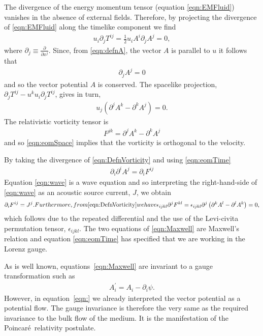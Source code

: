 \documentclass[10pt, fleqn,final,showtrims,oldfontcommands]{article} %
\newcommand{\sub}[1]{\begin{subequations}#1\end{subequations}}
\newcommand{\eqa}[1]{\begin{align}#1\end{align}}
\newcommand{\eqal}[2]{\begin{align}#1\label{eqn:#2}\end{align}}
\newcommand{\eqnref}[1]{\ref{eqn:#1}}
\newcommand{\lr}[1]{\left( #1 \right)}
\renewcommand{\d}{\partial}
\newcommand{\del}{\nabla}
\newcommand{\scope}[1]{\tilde{#1}}
\newcommand{\half}{\tfrac{1}{2}}
\newcommand{\Poincare}{Poincar{\'e}}
\begin{document}
The divergence of the energy momentum tensor (equation \eqnref{EMFluid}) vanishes in the absence of external fields.
Therefore, by projecting the divergence of \eqnref{EMFluid} along the timelike component we find
\eqa{
  u_i \d_j T^{i j} = \half u_i A^i \d_j A^j = 0,
}
where $\d_j \equiv \frac{\d}{\d x^j}$.
Since, from \eqnref{defnA}, the vector $A$ is parallel to $u$  it follows that 
\eqal{
  \d_j A^j = 0
}{eomTime}
and so the vector potential $A$ is conserved.
The spacelike projection,
$\d_j T^{i j} - u^k u_i \d_j T^{i j}$, gives in turn,
\eqal{
u_j \lr{\d^j A^k - \d^k A^j} = 0.
}{eomSpace}
The relativistic vorticity tensor is 
\eqal{
F^{j k} =\d^j A^k - \d^k A^j
}{DefnVorticity}
and so \eqnref{eomSpace} implies that the vorticity is orthogonal to the velocity.

By taking the divergence of \eqnref{DefnVorticity} and using \eqnref{eomTime} 
\eqal{
  \d_i \d^i A^j = \d_i F^{i j}
}{wave}
Equation \eqnref{wave} is a wave equation and so interpreting the right-hand-side of \eqnref{wave} as an acoustic source current, $J$, we obtain
\sub{
\label{eqn:Maxwell}
\eqa{
  \d_i F^{i j} = J^j.
}
Furthermore, from \eqnref{DefnVorticity} we have
\begin{align}
  \epsilon_{i j k l} \d^j F^{k l} = \epsilon_{i j k l} \d^j \lr{\d^k A^l - \d^l A^k} = 0,
\end{align}
}
which follows due to the repeated differential and the use of the Levi-civita permutation tensor, $\epsilon_{i j k l}$.
The two equations of \eqnref{Maxwell} are Maxwell's relation and equation \eqnref{eomTime} has specified that we are working in the Lorenz gauge.

As is well known, equations~\eqnref{Maxwell} are invariant to a gauge transformation such as
\begin{align}
  A_i^\prime = A_i - \d_i \psi.
\end{align}
However, in equation~\eqnref{} we already interpreted the vector potential as a potential flow.
The gauge invariance is therefore the very same as the required invariance to the bulk flow of the medium.
It is the manifestation of the \Poincare\ relativity postulate.
\end{document}
